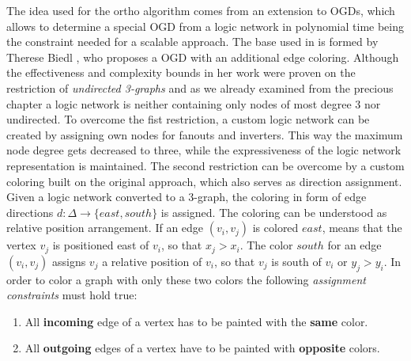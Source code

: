 The idea used for the ortho algorithm comes from an extension to OGDs, which allows to determine a special OGD from a logic network in polynomial time being the constraint needed for a scalable approach. The base used in \cite{ortho} is formed by Therese Biedl \cite{biedl1998better}, who proposes a OGD with an additional edge coloring. Although the effectiveness and complexity bounds in her work were proven on the restriction of \textit{undirected 3-graphs} and as we already examined from the precious chapter a logic network is neither containing only nodes of most degree 3 nor undirected. To overcome the fist restriction, a custom logic network can be created by assigning own nodes for fanouts and inverters. This way the maximum node degree gets decreased to three, while the expressiveness of the logic network representation is maintained. The second restriction can be overcome by a custom coloring built on the original approach, which also serves as direction assignment. Given a logic network converted to a 3-graph, the coloring in form of edge directions $d : \Delta \rightarrow \{east, south\}$ is assigned. The coloring can be understood as relative position arrangement. If an edge $(v_i, v_j)$ is colored $east$, means that the vertex $v_j$ is positioned east of $v_i$, so that $x_j > x_i$. The color $south$ for an edge $(v_i, v_j)$ assigns $v_j$ a relative position of $v_i$, so that $v_j$ is south of $v_i$ or $y_j > y_i$. In order to color a graph with only these two colors the following \textit{assignment constraints} must hold true:
\begin{enumerate}
	\item All \textbf{incoming} edge of a vertex has to be painted with the \textbf{same} color.
	\item All \textbf{outgoing} edges of a vertex have to be painted with \textbf{opposite} colors.
\end{enumerate}

